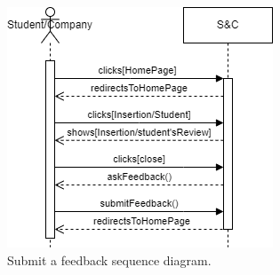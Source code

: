 \begin{figure}[H]
    \begin{center}
        \includegraphics[width=1\linewidth]{Images/image4.png}
        \caption{Submit a feedback sequence diagram.}
        \label{fig:submit_a_feedback_seqdiag}%
    \end{center}
\end{figure}


